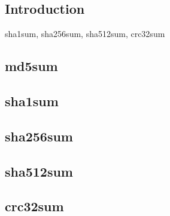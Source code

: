 
\subsection{Introduction}
 
sha1sum, sha256sum, sha512sum, crc32sum

\subsection{md5sum}

\subsection{sha1sum}

\subsection{sha256sum}

\subsection{sha512sum}

\subsection{crc32sum}


